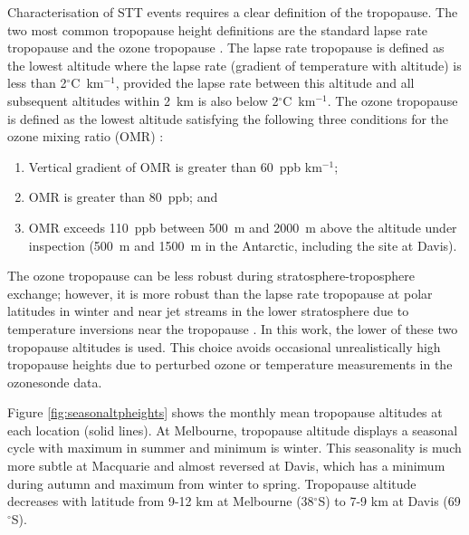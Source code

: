 \documentclass{article}
\begin{document}
    Characterisation of STT events requires a clear definition of the tropopause.
    The two most common tropopause height definitions are the standard lapse rate tropopause \citep{WMO1957} and the ozone tropopause \citep{Bethan1996}.
    The lapse rate tropopause is defined as the lowest altitude where the lapse rate (gradient of temperature with altitude) is less than 2$^\circ$C~km$^{-1}$, provided the lapse rate between this altitude and all subsequent altitudes within 2~km is also below 2$^\circ$C~km$^{-1}$.
    The ozone tropopause is defined as the lowest altitude satisfying the following three conditions for the ozone mixing ratio (OMR) \citep{Bethan1996}:
    \begin{enumerate}
      \item Vertical gradient of OMR is greater than 60~ppb km$^{-1}$;
      \item OMR is greater than 80~ppb; and
      \item OMR exceeds 110~ppb between 500~m and 2000~m above the altitude under inspection (500~m and 1500~m in the Antarctic, including the site at Davis).
    \end{enumerate}
    The ozone tropopause can be less robust during stratosphere-troposphere exchange; however, it is more robust than the lapse rate tropopause at polar latitudes in winter and near jet streams in the lower stratosphere due to temperature inversions near the tropopause \citep{Bethan1996, Tomikawa2009, Alexander2013}.
    In this work, the lower of these two tropopause altitudes is used. 
    This choice avoids occasional unrealistically high tropopause heights due to perturbed ozone or temperature measurements in the ozonesonde data.
    
    Figure \ref{fig:seasonaltpheights} shows the monthly mean tropopause altitudes at each location (solid lines).
    At Melbourne, tropopause altitude displays a seasonal cycle with maximum in summer and minimum is winter.
    This seasonality is much more subtle at Macquarie and almost reversed at Davis, which has a minimum during autumn and maximum from winter to spring.
    Tropopause altitude decreases with latitude from 9-12 km at Melbourne (38$^\circ$S) to 7-9 km at Davis (69$^\circ$S).
\end{document}
